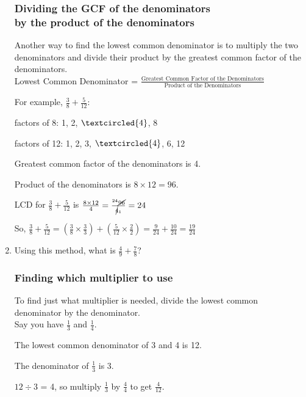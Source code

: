 \documentclass[14pt]{article}
\begin{document}
\begin{enumerate}
 \subsubsection*{Dividing the GCF of the denominators\\ by the product of the denominators} Another way to find the lowest common denominator is to multiply the two denominators and divide their product by the greatest common factor of the denominators.\\

Lowest Common Denominator = $\frac{\textrm{Greatest Common Factor of the Denominators}}{\textrm{Product of the Denominators}}$\\

\begin{onehalfspacing}
For example, $\frac{3}{8} + \frac{5}{12}$:

factors of 8: 1, 2, $\textcircled{4}$, 8

factors of 12: 1, 2, 3, $\textcircled{4}$, 6, 12

Greatest common factor of the denominators is 4.

Product of the denominators is $8 \times 12 = 96$.

LCD for $\frac{3}{8} + \frac{5}{12}$ is $\frac{8 \times 12}{4} = \frac{^{24}\cancel{96}}{\cancel{4}_1} = 24$

So, $\frac{3}{8} + \frac{5}{12} = (\frac{3}{8} \times \frac{3}{3})+(\frac{5}{12} \times \frac{2}{2}) = \frac{9}{24}+\frac{10}{24}=\frac{19}{24}$\\
\end{onehalfspacing}

\item Using this method, what is $\frac{4}{9}+\frac{7}{8}$?

\newpage

\subsubsection*{Finding which multiplier to use}
To find just what multiplier is needed, divide the lowest common denominator by the denominator.\\

Say you have $\frac{1}{3}$ and $\frac{1}{4}$.

The lowest common denominator of 3 and 4 is 12.

The denominator of $\frac{1}{3}$ is 3.

$12 \div 3$ = 4, so multiply $\frac{1}{3}$ by $\frac{4}{4}$ to get $\frac{4}{12}$.


\end{enumerate}
\end{document}
